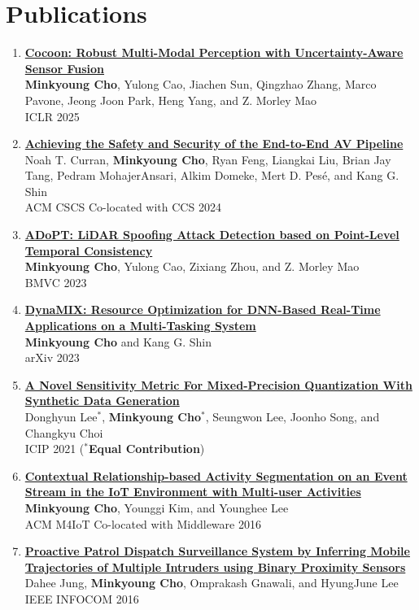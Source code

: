 \documentclass[letterpaper,oneside,11pt]{article}
\begin{document}
\section{Publications}
\begin{enumerate}[leftmargin=*, itemsep=0em]
  \item \small \textbf{\href{https://openreview.net/pdf?id=DKgAFfCs5F}{Cocoon: Robust Multi-Modal Perception with
  Uncertainty-Aware Sensor Fusion}} \\
  \textbf{Minkyoung Cho}, Yulong Cao, Jiachen Sun, Qingzhao Zhang, Marco Pavone, Jeong Joon Park, Heng Yang, and Z. Morley Mao\\ 
  ICLR 2025
  \item \small \textbf{\href{https://dl.acm.org/doi/abs/10.1145/3689936.3694694}{Achieving the Safety and Security of the End-to-End AV Pipeline}}\\
  Noah T. Curran, \textbf{Minkyoung Cho}, Ryan Feng, Liangkai Liu, Brian Jay Tang, Pedram MohajerAnsari, Alkim Domeke, Mert D. Pesé, and Kang G. Shin\\
  ACM CSCS Co-located with CCS 2024 
  \item \small \textbf{\href{https://arxiv.org/abs/2310.14504}{ADoPT: LiDAR Spoofing Attack Detection based on Point-Level Temporal Consistency}}\\
  \textbf{Minkyoung Cho}, Yulong Cao, Zixiang Zhou, and Z. Morley Mao\\
  BMVC 2023
  \item \small  \textbf{\href{https://arxiv.org/abs/2302.01568}{DynaMIX: Resource Optimization for DNN-Based Real-Time Applications on a Multi-Tasking System}}\\
  \textbf{Minkyoung Cho} and Kang G. Shin\\
  arXiv 2023
  \item \small \textbf{\href{https://ieeexplore.ieee.org/abstract/document/9506527}{A Novel Sensitivity Metric For Mixed-Precision Quantization With Synthetic Data Generation}}\\
  Donghyun Lee$^\ast$, \textbf{Minkyoung Cho$^\ast$}, Seungwon Lee, Joonho Song, and Changkyu Choi \\
  ICIP 2021 ($^\ast$\textbf{Equal Contribution})
  \item \small \textbf{\href{https://dl.acm.org/doi/10.1145/3008631.3008633}{Contextual Relationship-based Activity Segmentation on an Event Stream in the IoT Environment with Multi-user Activities}}\\
  \textbf{Minkyoung Cho}, Younggi Kim, and Younghee Lee\\
  ACM M4IoT Co-located with Middleware 2016
  \item \small \textbf{\href{https://ieeexplore.ieee.org/abstract/document/7524369}{Proactive Patrol Dispatch Surveillance System by Inferring Mobile Trajectories of Multiple Intruders using Binary Proximity Sensors}}\\
  Dahee Jung, \textbf{Minkyoung Cho}, Omprakash Gnawali, and HyungJune Lee\\  
  IEEE INFOCOM 2016
\end{enumerate}
\end{document}
